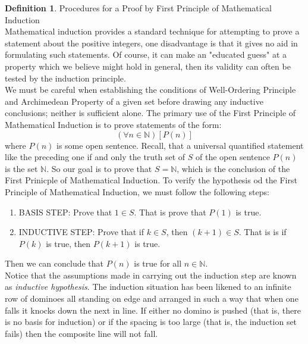 \documentclass{book}
\theoremstyle{definition}
\newtheorem{definition}{Definition}[section]
\theoremstyle{remark}
\newcommand{\bb}[1]{\mathbb{#1}}
\begin{document}
\newpage
\begin{definition}
Procedures for a Proof by First Principle of Mathematical Induction \\

Mathematical induction provides a standard technique for attempting to prove a statement about the positive integers, one disadvantage is that it gives no aid in formulating such statements. Of course, it can make an "educated guess" at a property which we believe might hold in general, then its validity can often be tested by the induction principle. \\

We must be careful when establishing the conditions of Well-Ordering Principle and Archimedean Property of a given set before drawing any inductive conclusions; neither is sufficient alone. The primary use of the First Principle of Mathematical Induction is to prove statements of the form:
    \begin{equation*}
        (\forall n \in \bb{N})[P(n)]
    \end{equation*}
where $P(n)$ is some open sentence. Recall, that a universal quantified statement like the preceding one if and only the truth set of $S$ of the open sentence $P(n)$ is the set $\bb{N}$. So our goal is to prove that $S = \bb{N}$, which is the conclusion of the First Prinicple of Mathematical Induction. To verify the hypothesis od the First Principle of Mathematical Induction, we must follow the following steps:
    \begin{enumerate}
        \item BASIS STEP: Prove that  $1 \in S$. That is prove that $P(1)$ is true.
        \item INDUCTIVE STEP: Prove that if $k \in S$, then $(k+1) \in S$. That is is if $P(k)$ is true, then $P(k+1)$ is true.
    \end{enumerate}
Then we can conclude that $P(n)$ is true for all $n \in \bb{N}$. \\

Notice that the assumptions made in carrying out the induction step are known as \textit{inductive hypothesis}. The induction situation has been likened to an infinite row of dominoes all standing on edge and arranged in such a way that when one falls it knocks down the next in line. If either no domino is pushed (that is, there is no basis for induction) or if the spacing is too large (that is, the induction set fails) then the composite line will not fall. \\   


\end{definition}
\end{document}
